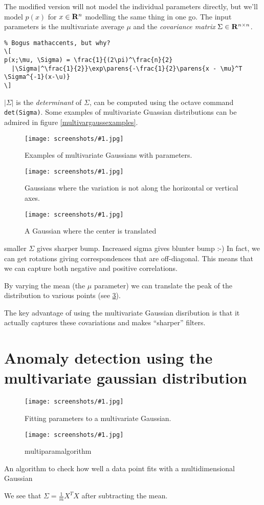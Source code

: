 \documentclass[a4, 12pt, english, USenglish]{scrreprt}
\newcommand{\screenshot}[2]{
\begin{figure}[htb]
\texttt{[image: screenshots/\#1.jpg]}
\label{#1}
\caption{#2}
\end{figure}}
\newcommand{\parens}[1]{\ensuremath{\left({#1}\right)}}
\newcommand{\idx}[1]{{\em #1}\index{#1}}
\begin{document}
\newcommand{\mathbb}[1]{{\bf #1}}
The modified version will not model the individual parameters
directly, but we'll model \(p(x)\) for \(x\in \mathbb{R}^n\)
modelling the same thing in one go. The input parameters is the
multivariate average \(\mu\)  and the \idx{covariance matrix} \(\Sigma \in
\mathbb{R}^{n\times n}\).


\begin{verbatim}
% Bogus mathaccents, but why?
\[
p(x;\mu, \Sigma) = \frac{1}{(2\pi)^\frac{n}{2}
  |\Sigma|^\frac{1}{2}}\exp\parens{-\frac{1}{2}\parens{x - \mu}^T \Sigma^{-1}(x-\u)}
\]
\end{verbatim}

\(|\Sigma|\) is the \idx{determinant} of \(\Sigma\), can be computed
using the octave command \verb!det(Sigma)!.  Some examples of
multivariate Guassian distributions can be admired in figure \ref{multivargaussexamples}.

\screenshot{multivariategaussexamples}{Examples of multivariate
  Gaussians with parameters.}

\screenshot{offidagonalsgaussians}{Gaussians where the variation is
  not along the horizontal or vertical axes.}

\screenshot{translatedgaussians}{A Gaussian where the center is translated}


smaller \(\Sigma\) gives sharper bump.  Increased sigma gives blunter
bump :-)  In fact, we can get rotations giving correspondences that
are off-diagonal.  This means that we can capture both negative and
positive correlations.


By varying the mean (the \(\mu\) parameter) we can translate the peak
of the distribution to various points (see \ref{translatedgaussians}).

The key advantage of using the multivariate Gaussian disribution is
that it actually captures these covariations and makes ``sharper'' filters.

\section{Anomaly detection using the multivariate gaussian distribution}

\screenshot{multivariateparameterfitting}{Fitting parameters to a
  multivariate Gaussian.}

\screenshot{multiparamalgorithm}{multiparamalgorithm}{An algorithm to
  check how well a data point fits with a multidimensional Gaussian}


We see that \(\Sigma = \frac{1}{m} X^TX\) after subtracting the mean.
\end{document}
